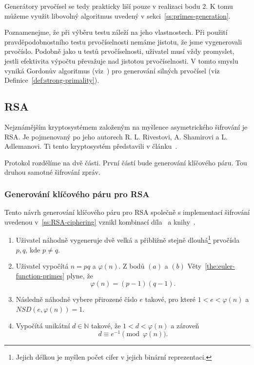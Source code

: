 \documentclass[
  program=infoi,
  biblatex=false,
  figures=true,
  glossaries,
  tables=false,
  sourcecodes=true,
  index
]{kidiplom}
\begin{document}
        Generátory prvočísel se tedy prakticky liší pouze v realizaci bodu 2.
        K tomu můžeme využit libovolný algoritmus uvedený v sekci~\ref{ss:primes-generation}.

        Poznamenejme, že při výběru testu záleží na jeho vlastnostech.
        Při použití pravděpodobnostního testu prvočíselnosti nemáme jistotu, že jsme vygenerovali prvočíslo.
        Podobně jako u testů prvočíselnosti, uživatel musí vždy promyslet, jestli efektivita
        výpočtu převažuje nad jistotou prvočíselnosti.
        V tomto smyslu vyniká Gordonův algoritmus (viz~\cite{handbook}) pro generování silných prvočísel (viz Definice~\ref{def:strong-primality}).


\subsection{RSA}\label{sub:RSA}
  
    Nejznámějším kryptosystémem založeným na myšlence asymetrického šifrování je RSA.
    Je pojmenovaný po jeho autorech R. L. Rivestovi, A. Shamirovi a L. Adlemanovi.
    Ti tento kryptosystém představili v článku~\cite{rsa-original}.

    Protokol rozdělíme na dvě části.
    První částí bude generování klíčového páru.
    Tou druhou samotné šifrování zpráv.


    \subsubsection{Generování klíčového páru pro RSA}\label{ss:RSA-key-generation}

        Tento návrh generování klíčového páru pro RSA společně s implementací šifrování uvedenou v~\ref{ss:RSA-ciphering}
        vznikl kombinací díla~\cite{graduate-course} a knihy~\cite{rsa-and-public}.

        \begin{enumerate}
            \item 
                Uživatel náhodně vygeneruje dvě velká a přibližně stejně dlouhá\footnote{Jejich délkou je myšlen počet cifer v jejich
                binární reprezentaci.} prvočísla $p,q$, kde $p \neq q$.
            \item
                Uživatel vypočítá $n=pq$ a $\varphi(n)$. Z bodů $(a)$ a $(b)$ Věty~\ref{the:euler-function-primes} plyne, že
                \[
                    \varphi(n) = (p-1)(q-1).
                \]
            \item
                Následně náhodně vybere přirozené číslo $e$ takové, pro které $1 < e < \varphi(n)$ a $NSD(e, \varphi(n)) = 1$.
            \item
                Vypočítá unikátní $d \in \mathbb{N}$ takové, že $1 < d < \varphi(n)$ a zároveň
                \[
                    d \equiv e^{-1} \pmod{\varphi(n)}.
                \]
        \end{enumerate}
\end{document}

